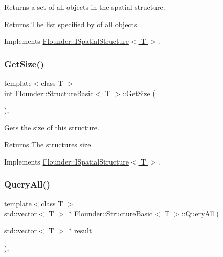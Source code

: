 Returns a set of all objects in the spatial structure. 

\begin{DoxyReturn}{Returns}
The list specified by of all objects. 
\end{DoxyReturn}


Implements \hyperlink{class_flounder_1_1_i_spatial_structure_a533a5190b622a2ee4e36d28a59d9b12f}{Flounder\+::\+I\+Spatial\+Structure$<$ T $>$}.

\mbox{\label{class_flounder_1_1_structure_basic_a4e7c03380511e986ba879f0c953b3993}} 
\subsubsection{\texorpdfstring{Get\+Size()}{GetSize()}}
{\footnotesize\ttfamily template$<$class T $>$ \\
int \hyperlink{class_flounder_1_1_structure_basic}{Flounder\+::\+Structure\+Basic}$<$ T $>$\+::Get\+Size (\begin{DoxyParamCaption}{ }\end{DoxyParamCaption})\hspace{0.3cm}{\ttfamily [override]}, {\ttfamily [virtual]}}



Gets the size of this structure. 

\begin{DoxyReturn}{Returns}
The structures size. 
\end{DoxyReturn}


Implements \hyperlink{class_flounder_1_1_i_spatial_structure_ab638001c851bd7cf2525035ffa21b8b4}{Flounder\+::\+I\+Spatial\+Structure$<$ T $>$}.

\mbox{\label{class_flounder_1_1_structure_basic_a1d85dcd21ad7547b1113eee8e6dc7b8e}} 
\subsubsection{\texorpdfstring{Query\+All()}{QueryAll()}}
{\footnotesize\ttfamily template$<$class T $>$ \\
std\+::vector$<$ T $>$ $\ast$ \hyperlink{class_flounder_1_1_structure_basic}{Flounder\+::\+Structure\+Basic}$<$ T $>$\+::Query\+All (\begin{DoxyParamCaption}\item[{std\+::vector$<$ T $>$ $\ast$}]{result }\end{DoxyParamCaption})\hspace{0.3cm}{\ttfamily [override]}, {\ttfamily [virtual]}}



